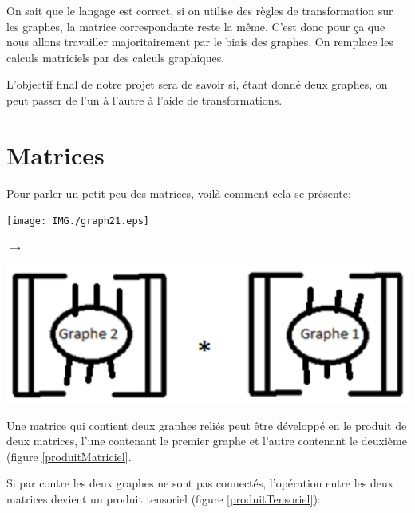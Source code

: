 \documentclass[a4paper,oneside]{book}
\begin{document}
On sait que le langage est correct, si on utilise des règles de transformation sur les graphes, la matrice correspondante reste la même. C'est donc pour ça que nous allons travailler majoritairement par le biais des graphes. On remplace les calculs matriciels par des calculs graphiques.

L'objectif final de notre projet sera de savoir si, étant donné deux graphes, on peut passer de l'un à l'autre à l'aide de transformations.


\section{Matrices}
Pour parler un petit peu des matrices, voilà comment cela se présente:

\begin{center}
\begin{minipage}[c]{0.2\textwidth}
\texttt{[image: IMG./graph21.eps]}

\end{minipage}
\hspace{0.5cm}\Huge{$\longrightarrow$}
\begin{minipage}[c]{0.6\textwidth}
\includegraphics[scale=1]{IMG/graph2x1.eps}

\end{minipage}
\label{produitMatriciel}
\end{center}

Une matrice  qui contient deux graphes reliés peut être développé en le produit de deux matrices, l'une contenant le premier graphe et l'autre contenant le deuxième (figure \ref{produitMatriciel}.

Si par contre les deux graphes ne sont pas connectés, l'opération entre les deux matrices devient un produit tensoriel (figure \ref{produitTensoriel}):
\end{document}
